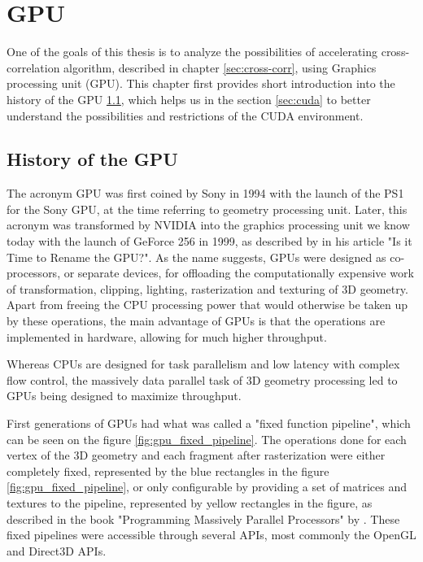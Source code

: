\section{GPU}

One of the goals of this thesis is to analyze the possibilities of accelerating cross-correlation algorithm, described in chapter \ref{sec:cross-corr}, using Graphics processing unit (GPU). This chapter first provides short introduction into the history of the GPU \ref{sec:gpu_history}, which helps us in the section \ref{sec:cuda} to better understand the possibilities and restrictions of the CUDA environment.


\subsection{History of the GPU}
\label{sec:gpu_history}
The acronym GPU was first coined by Sony in 1994 with the launch of the PS1 for the Sony GPU, at the time referring to geometry processing unit. Later, this acronym was transformed by NVIDIA %
 into the graphics processing unit we know today with the launch of GeForce 256 in 1999, as described by \citep{gpuacro} in his article "Is it Time to Rename the GPU?". 
As the name suggests, GPUs were designed as co-processors, or separate devices, for offloading the computationally expensive work of transformation, clipping, lighting, rasterization and texturing of 3D geometry. Apart from freeing the CPU processing power that would otherwise be taken up by these operations, the main advantage of GPUs is that the operations are implemented in hardware, allowing for much higher throughput. 

Whereas CPUs are designed for task parallelism and low latency with complex flow control, the massively data parallel task of 3D geometry processing led to GPUs being designed to maximize throughput. %

First generations of GPUs had what was called a "fixed function pipeline", which can be seen on the figure \ref{fig:gpu_fixed_pipeline}. The operations done for each vertex of the 3D geometry and each fragment after rasterization were either completely fixed, represented by the blue rectangles in the figure \ref{fig:gpu_fixed_pipeline}, or only configurable by providing a set of matrices and textures to the pipeline, represented by yellow rectangles in the figure, as described in the book "Programming Massively Parallel Processors" by \citep{book:paraproc}. These fixed pipelines were accessible through several APIs, most commonly the OpenGL and Direct3D APIs.

